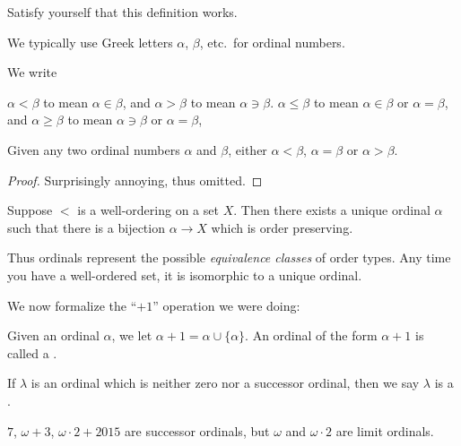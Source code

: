 \begin{ques}
	Satisfy yourself that this definition works.
\end{ques}

We typically use Greek letters $\alpha$, $\beta$, etc.\ for ordinal numbers.
\begin{definition}
	We write
	\begin{itemize}
		\ii $\alpha < \beta$ to mean $\alpha \in \beta$,
		and $\alpha > \beta$ to mean $\alpha \ni \beta$.
		\ii $\alpha \le \beta$ to mean $\alpha \in \beta$ or $\alpha = \beta$,
		and $\alpha \ge \beta$ to mean $\alpha \ni \beta$ or $\alpha = \beta$,
	\end{itemize}
\end{definition}

\begin{theorem}
	Given any two ordinal numbers $\alpha$ and $\beta$,
	either $\alpha < \beta$, $\alpha = \beta$ or $\alpha > \beta$.
\end{theorem}
\begin{proof}
	Surprisingly annoying, thus omitted.
\end{proof}
\begin{theorem}
	Suppose $<$ is a well-ordering on a set $X$.
	Then there exists a unique ordinal $\alpha$
	such that there is a bijection $\alpha \to X$
	which is order preserving.
\end{theorem}
Thus ordinals represent the possible \emph{equivalence classes} of order types.
Any time you have a well-ordered set, it is isomorphic to a unique ordinal.

We now formalize the ``$+1$'' operation we were doing:
\begin{definition}
	Given an ordinal $\alpha$, we let $\alpha+1 = \alpha \cup \{\alpha\}$.
	An ordinal of the form $\alpha+1$ is called a .
\end{definition}
\begin{definition}
	If $\lambda$ is an ordinal which is neither zero nor a successor ordinal,
	then we say $\lambda$ is a .
\end{definition}
\begin{example}
	$7$, $\omega+3$, $\omega\cdot2+2015$ are successor ordinals,
	but $\omega$ and $\omega \cdot 2$ are limit ordinals.
\end{example}

